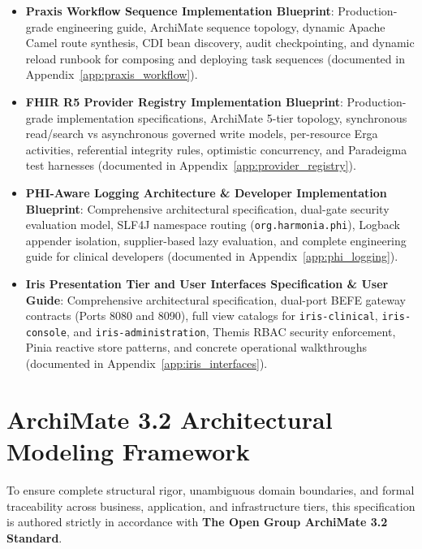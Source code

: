 \begin{itemize}
    \item \textbf{Praxis Workflow Sequence Implementation Blueprint}: Production-grade engineering guide, ArchiMate sequence topology, dynamic Apache Camel route synthesis, CDI bean discovery, audit checkpointing, and dynamic reload runbook for composing and deploying task sequences (documented in Appendix~\ref{app:praxis_workflow}).
    \item \textbf{FHIR R5 Provider Registry Implementation Blueprint}: Production-grade implementation specifications, ArchiMate 5-tier topology, synchronous read/search vs asynchronous governed write models, per-resource Erga activities, referential integrity rules, optimistic concurrency, and Paradeigma test harnesses (documented in Appendix~\ref{app:provider_registry}).
    \item \textbf{PHI-Aware Logging Architecture \& Developer Implementation Blueprint}: Comprehensive architectural specification, dual-gate security evaluation model, SLF4J namespace routing (\texttt{org.harmonia.phi}), Logback appender isolation, supplier-based lazy evaluation, and complete engineering guide for clinical developers (documented in Appendix~\ref{app:phi_logging}).
    \item \textbf{Iris Presentation Tier and User Interfaces Specification \& User Guide}: Comprehensive architectural specification, dual-port BEFE gateway contracts (Ports 8080 and 8090), full view catalogs for \texttt{iris-clinical}, \texttt{iris-console}, and \texttt{iris-administration}, Themis RBAC security enforcement, Pinia reactive store patterns, and concrete operational walkthroughs (documented in Appendix~\ref{app:iris_interfaces}).
\end{itemize}

\section*{ArchiMate 3.2 Architectural Modeling Framework}

To ensure complete structural rigor, unambiguous domain boundaries, and formal traceability across business, application, and infrastructure tiers, this specification is authored strictly in accordance with \textbf{The Open Group ArchiMate 3.2 Standard}.

